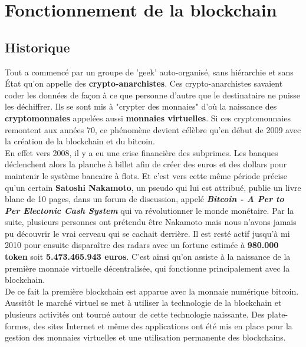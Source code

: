\documentclass[12pt]{report}
\begin{document}
\newpage
\section{Fonctionnement de la blockchain}


	\subsection{Historique}
\hspace{1cm} Tout a commencé par un groupe de 'geek' auto-organisé, sans hiérarchie et sans État qu'on appelle des \textbf{crypto-anarchistes}. Ces crypto-anarchistes savaient coder les données de façon à ce que personne d'autre que le destinataire ne puisse les déchiffrer. Ils se sont mis à "crypter des monnaies" d'où la naissance des \textbf{cryptomonnaies} appelées aussi \textbf{ monnaies virtuelles}. Si ces cryptomonnaies remontent aux années 70, ce phénomène devient célèbre qu'en début de 2009 avec la création de la blockchain et du bitcoin.\\

\hspace{1cm} En effet vers 2008, il y a eu une crise financière des subprimes. Les banques déclenchent alors la planche à billet afin de créer des euros et des dollars pour maintenir le système bancaire à flots. Et c'est vers cette même période précise qu'un certain \textbf{Satoshi Nakamoto}, un pseudo qui lui est attribué, publie un livre blanc de 10 pages, dans un forum de discussion, appelé \textbf{\textit{Bitcoin - A Per to Per Electonic Cash System }} qui va révolutionner le monde monétaire. Par la suite, plusieurs personnes ont prétendu être Nakamoto mais nous n'avons jamais pu découvrir le vrai cerveau qui se cachait derrière. Il est resté actif jusqu'à mi 2010 pour ensuite disparaître des radars avec un fortune estimée à \textbf{980.000 token} soit \textbf{5.473.465.943 euros}. C'est ainsi qu'on assiste à la naissance  de la première monnaie virtuelle décentralisée, qui fonctionne principalement avec la blockchain. \\ 

\hspace{1cm} De ce fait la première blockchain est apparue avec la monnaie numérique bitcoin. Aussitôt le marché virtuel se met à utiliser la technologie de la blockchain et plusieurs activités ont tourné autour de cette technologie naissante. Des plate-formes, des sites Internet et même des applications ont été mis en place pour la gestion des monnaies virtuelles et une utilisation permanente des blockchains.
\end{document}
